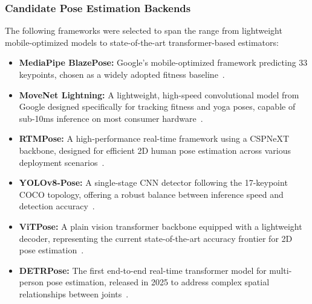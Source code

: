 \documentclass[conference,onecolumn,oneside]{IEEEtran}
\begin{document}
\subsubsection{Candidate Pose Estimation Backends}
\vspace{0.3cm}
The following frameworks were selected to span the range from lightweight mobile-optimized models to state-of-the-art transformer-based estimators:
\begin{itemize}
    \item \textbf{MediaPipe BlazePose:} Google's mobile-optimized framework predicting 33 keypoints, chosen as a widely adopted fitness baseline~\cite{17}.
    \item \textbf{MoveNet Lightning:} A lightweight, high-speed convolutional model from Google designed specifically for tracking fitness and yoga poses, capable of sub-10ms inference on most consumer hardware~\cite{18}.
    \item \textbf{RTMPose:} A high-performance real-time framework using a CSPNeXT backbone, designed for efficient 2D human pose estimation across various deployment scenarios~\cite{19}.
    \item \textbf{YOLOv8-Pose:} A single-stage CNN detector following the 17-keypoint COCO topology, offering a robust balance between inference speed and detection accuracy~\cite{20}.
    \item \textbf{ViTPose:} A plain vision transformer backbone equipped with a lightweight decoder, representing the current state-of-the-art accuracy frontier for 2D pose estimation~\cite{21}.
    \item \textbf{DETRPose:} The first end-to-end real-time transformer model for multi-person pose estimation, released in 2025 to address complex spatial relationships between joints~\cite{22}.
\end{itemize}
\end{document}
